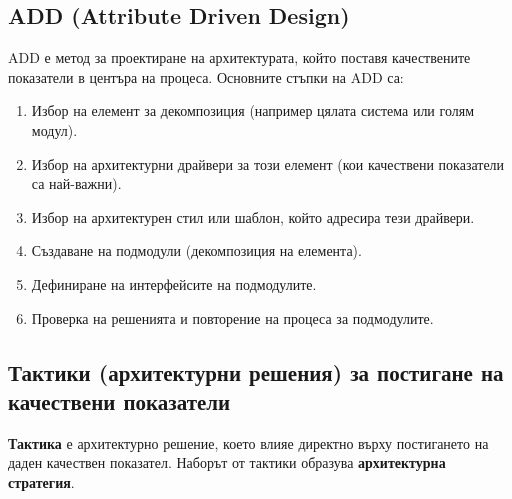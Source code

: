 \documentclass{scrartcl}
\begin{document}
\begin{FlushLeft}
\subsection{ADD (Attribute Driven Design)}

ADD е метод за проектиране на архитектурата, който поставя качествените показатели в центъра на процеса. Основните стъпки на ADD са:
\begin{enumerate}
    \item Избор на елемент за декомпозиция (например цялата система или голям модул).
    \item Избор на архитектурни драйвери за този елемент (кои качествени показатели са най-важни).
    \item Избор на архитектурен стил или шаблон, който адресира тези драйвери.
    \item Създаване на подмодули (декомпозиция на елемента).
    \item Дефиниране на интерфейсите на подмодулите.
    \item Проверка на решенията и повторение на процеса за подмодулите.
\end{enumerate}

\subsection{Тактики (архитектурни решения) за постигане на качествени показатели}

\textbf{Тактика} е архитектурно решение, което влияе директно върху постигането на даден качествен показател. Наборът от тактики образува \textbf{архитектурна стратегия}.


\end{FlushLeft}
\end{document}
